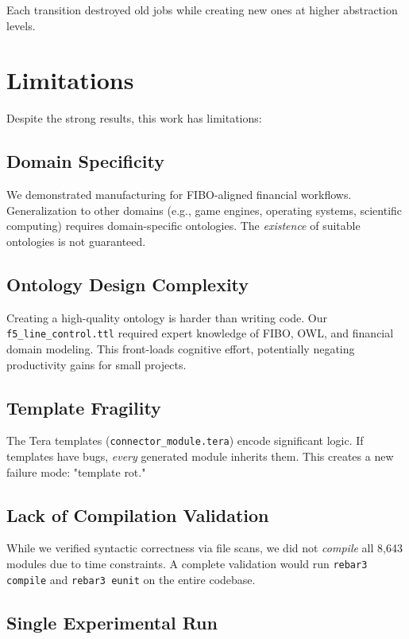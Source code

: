 Each transition destroyed old jobs while creating new ones at higher abstraction levels.

\section{Limitations}

Despite the strong results, this work has limitations:

\subsection{Domain Specificity}

We demonstrated manufacturing for FIBO-aligned financial workflows. Generalization to other domains (e.g., game engines, operating systems, scientific computing) requires domain-specific ontologies. The \textit{existence} of suitable ontologies is not guaranteed.

\subsection{Ontology Design Complexity}

Creating a high-quality ontology is harder than writing code. Our \texttt{f5\_line\_control.ttl} required expert knowledge of FIBO, OWL, and financial domain modeling. This front-loads cognitive effort, potentially negating productivity gains for small projects.

\subsection{Template Fragility}

The Tera templates (\texttt{connector\_module.tera}) encode significant logic. If templates have bugs, \textit{every} generated module inherits them. This creates a new failure mode: "template rot."

\subsection{Lack of Compilation Validation}

While we verified syntactic correctness via file scans, we did not \textit{compile} all 8,643 modules due to time constraints. A complete validation would run \texttt{rebar3 compile} and \texttt{rebar3 eunit} on the entire codebase.

\subsection{Single Experimental Run}

